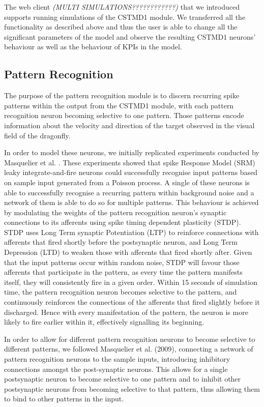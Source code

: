 \documentclass[a4paper,11pt]{article}
\begin{document}
The web client \emph{\color{red}(MULTI SIMULATIONS????????????)} that we introduced supports running simulations of the CSTMD1 module. We transferred all the functionality as described above and thus the user is able to change all the significant parameters of the model and observe the resulting CSTMD1 neurons' behaviour as well as the behaviour of KPIs in the model.

\subsection{Pattern Recognition}

The purpose of the pattern recognition module is to discern recurring spike patterns within the output from the CSTMD1 module, with each pattern recognition neuron becoming selective to one pattern. Those patterns encode information about the velocity and direction of the target observed in the visual field of the dragonfly.\par

	In order to model these neurons, we initially replicated experiments conducted by Masquelier et al. \cite{stdp2} \cite{stdp1}. These experiments showed that spike Response Model (SRM) leaky integrate-and-fire neurons could successfully recognise input patterns based on sample input generated from a Poisson process. A single of these neurons is able to successfully recognise a recurring pattern within background noise and a network of them is able to do so for multiple patterns. This behaviour is achieved by modulating the weights of the pattern recognition neuron's synaptic connections to its afferents using spike timing dependent plasticity (STDP). STDP uses Long Term synaptic Potentiation (LTP) to reinforce connections with afferents that fired shortly before the postsynaptic neuron, and Long Term Depression (LTD) to weaken those with afferents that fired shortly after. Given that the input patterns occur within random noise, STDP will favour those afferents that participate in the pattern, as every time the pattern manifests itself, they will consistently fire in a given order. Within 15 seconds of simulation time, the pattern recognition neuron becomes selective to the pattern, and continuously reinforces the connections of the afferents that fired slightly before it discharged. Hence with every manifestation of the pattern, the neuron is more likely to fire earlier within it, effectively signalling its beginning.\par

	In order to allow for different pattern recognition neurons to become selective to different patterns, we followed Masquelier et al. (2009), connecting a network of pattern recognition neurons to the sample inputs, introducing inhibitory connections amongst the post-synaptic neurons. This allows for a single postsynaptic neuron to become selective to one pattern and to inhibit other postsynaptic neurons from becoming selective to that pattern, thus allowing them to bind to other patterns in the input.\par
	
\end{document}
